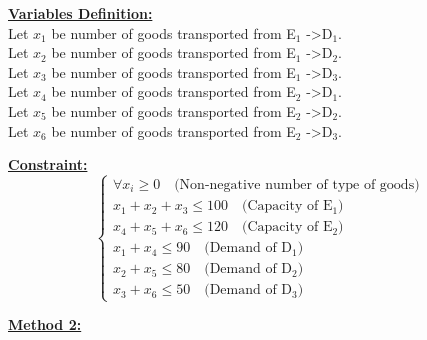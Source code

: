 \vspace{0.5cm}
\begin{minipage}[t]{0.45\textwidth}
    \textbf{\underline{Variables Definition:}} \\[1em] %

    Let \(x_1\) be number of goods transported from E$_{1}$ -\textgreater D$_{1}$. \\
   
    Let \(x_2\) be number of goods transported from E$_{1}$ -\textgreater D$_{2}$. \\
   
    Let \(x_3\) be number of goods transported from E$_{1}$ -\textgreater D$_{3}$. \\
    
    Let \(x_4\) be number of goods transported from E$_{2}$ -\textgreater D$_{1}$. \\
    
    Let \(x_5\) be number of goods transported from E$_{2}$ -\textgreater D$_{2}$. \\
    
    Let \(x_6\) be number of goods transported from E$_{2}$ -\textgreater D$_{3}$. \\
    
\end{minipage}%
\hfill %
\begin{minipage}[t]{0.45\textwidth}
    \textbf{\underline{Constraint:}} \\[1em]
    \[
    \left\{
        \begin{array}{l}
            \forall x_i \geq 0 \quad \text{(Non-negative number of type of goods)}\\
            x_1 + x_2 + x_3   \leq 100 \quad \text{(Capacity of E$_{1}$)}\\
            x_4 + x_5 + x_6 \leq 120 \quad \text{(Capacity of E$_{2}$)}\\
            x_1 + x_4 \leq 90 \quad \text{(Demand of D$_{1}$)}\\
            x_2 + x_5 \leq 80 \quad \text{(Demand of D$_{2}$)}\\
            x_3 + x_6 \leq 50 \quad \text{(Demand of D$_{3}$)}
        \end{array}
    \right.
    \]
\end{minipage}
\vspace{0.5cm}


\textbf{\underline{Method 2:}}

